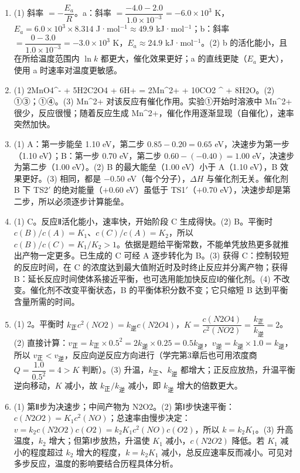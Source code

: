 \documentclass[UTF8,a4paper,zihao=5,oneside,openany,fontset=none]{ctexbook}
\def\mathrm#1{#1}\def\text#1{#1}\def\ensuremath#1{#1}\def\ce#1{#1}%
\newenvironment{jiexilist}{\small\begin{enumerate}[label={\textbf{\arabic*}.},leftmargin=1.6em,itemsep=0.3em,topsep=0.2em]}{\end{enumerate}}
\newcommand{\vz}{v_{\text{正}}}
\newcommand{\vn}{v_{\text{逆}}}
\newcommand{\kz}{k_{\text{正}}}
\newcommand{\kn}{k_{\text{逆}}}
\begin{document}
\begin{jiexilist}
\item (1) 斜率 $=-\dfrac{E_\text{a}}{R}$。a：斜率 $=\dfrac{-4.0-2.0}{1.0\times10^{-3}}=-6.0\times10^3$ K，$E_\text{a}=6.0\times10^3\times8.314$ J·mol$^{-1}\approx49.9$ kJ·mol$^{-1}$；b：斜率 $=\dfrac{0-3.0}{1.0\times10^{-3}}=-3.0\times10^3$ K，$E_\text{a}\approx24.9$ kJ·mol$^{-1}$。(2) b 的活化能小，且在所给温度范围内 $\ln k$ 都更大，催化效果更好；a 的直线更陡（$E_\text{a}$ 更大），使用 a 时速率对温度更敏感。
\item (1) \ce{2MnO4^- + 5H2C2O4 + 6H+ = 2Mn^2+ + 10CO2 ^ + 8H2O}。(2) ①③；①④。(3) \ce{Mn^2+} 对该反应有催化作用。实验①开始时溶液中 \ce{Mn^2+} 很少，反应很慢；随着反应生成 \ce{Mn^2+}，催化作用逐渐显现（自催化），速率突然加快。
\item (1) A：第一步能垒 1.10 eV，第二步 $0.85-0.20=0.65$ eV，决速步为第一步（1.10 eV）；B：第一步 0.70 eV，第二步 $0.60-(-0.40)=1.00$ eV，决速步为第二步（1.00 eV）。(2) B 的最大能垒（1.00 eV）小于 A（1.10 eV），B 效果更好。(3) 相同，都是 $-0.50$ eV（每个分子），$\Delta H$ 与催化剂无关。催化剂 B 下 TS2$'$ 的绝对能量（$+0.60$ eV）虽低于 TS1$'$（$+0.70$ eV），决速步却是第二步，所以必须逐步计算能垒。
\item (1) C。反应Ⅱ活化能小，速率快，开始阶段 C 生成得快。(2) B。平衡时 $c(\mathrm B)/c(\mathrm A)=K_1$、$c(\mathrm C)/c(\mathrm A)=K_2$，所以 $c(\mathrm B)/c(\mathrm C)=K_1/K_2>1$。依据是题给平衡常数，不能单凭放热更多就推出产物一定更多。已生成的 C 可经 A 逐步转化为 B。(3) 获得 C：控制较短的反应时间，在 C 的浓度达到最大值附近时及时终止反应并分离产物；获得 B：延长反应时间使体系接近平衡，也可选用能加快反应Ⅰ的催化剂。(4) 不改变。催化剂不改变平衡状态，B 的平衡体积分数不变；它只缩短 B 达到平衡含量所需的时间。
\item (1) 2。平衡时 $\kz c^2(\ce{NO2})=\kn c(\ce{N2O4})$，$K=\dfrac{c(\ce{N2O4})}{c^2(\ce{NO2})}=\dfrac{\kz}{\kn}=2$。(2) 直接计算：$\vz=\kz\times0.5^2=2\kn\times0.25=0.5\kn$，$\vn=\kn\times1.0=\kn$，所以 $\vz<\vn$，反应向逆反应方向进行（学完第3章后也可用浓度商 $Q=\dfrac{1.0}{0.5^2}=4>K$ 判断）。(3) 升温，$\kz$、$\kn$ 都增大；正反应放热，升温平衡逆向移动，$K$ 减小，故 $\kz/\kn$ 减小，即 $\kn$ 增大的倍数更大。
\item (1) 第Ⅱ步为决速步；中间产物为 \ce{N2O2}。(2) 第Ⅰ步快速平衡：$c(\ce{N2O2})=K_1c^2(\ce{NO})$；总速率由慢步决定：$v=k_2c(\ce{N2O2})c(\ce{O2})=k_2K_1c^2(\ce{NO})c(\ce{O2})$，所以 $k=k_2K_1$。(3) 升高温度，$k_2$ 增大；但第Ⅰ步放热，升温使 $K_1$ 减小，$c(\ce{N2O2})$ 降低。若 $K_1$ 减小的程度超过 $k_2$ 增大的程度，$k=k_2K_1$ 减小，总反应速率反而减小。可见对多步反应，温度的影响要结合历程具体分析。
\end{jiexilist}
\newcommand{\cthreevtaxes}{\draw[c3ax] (0,0)--(4.2,0) node[below]{$t$}; \draw[c3ax] (0,0)--(0,3.2) node[left]{$v$}; \draw[c3cv] (0,1.3)--(1.2,1.3);}
\end{document}
